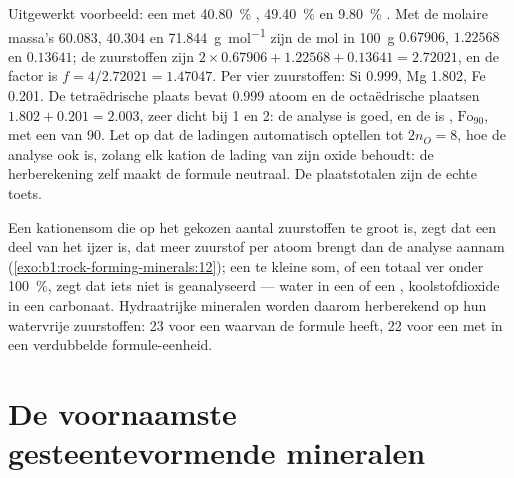 Uitgewerkt voorbeeld: een  met \qty{40.80}{\percent} , \qty{49.40}{\percent}  en \qty{9.80}{\percent} .
Met de molaire massa's \num{60.083}, \num{40.304} en \qty{71.844}{g.mol^{-1}} zijn de mol in \qty{100}{g} $0.67906$, $1.22568$ en $0.13641$; de
zuurstoffen zijn $2\times0.67906 + 1.22568 + 0.13641 = 2.72021$, en de factor is
$f = 4/2.72021 = 1.47047$. Per vier zuurstoffen: Si \num{0.999}, Mg \num{1.802},
Fe \num{0.201}. De tetraëdrische plaats bevat \num{0.999} atoom en de octaëdrische
plaatsen $1.802 + 0.201 = 2.003$, zeer dicht bij 1 en 2: de analyse is goed, en de  is , $\text{Fo}_{90}$,
met een  van 90. Let op dat de ladingen automatisch optellen tot $2n_O = 8$, hoe de analyse ook is, zolang elk kation de
lading van zijn oxide behoudt: de herberekening zelf maakt de formule neutraal. De plaatstotalen zijn de echte toets.

Een kationensom die op het gekozen aantal zuurstoffen te groot is, zegt dat een deel van het ijzer  is, dat meer zuurstof
per atoom brengt dan de analyse aannam (\cref{exo:b1:rock-forming-minerals:12}); een te kleine som, of een totaal ver onder
\qty{100}{\percent}, zegt dat iets niet is geanalyseerd --- water in een  of een , koolstofdioxide in een carbonaat.
Hydraatrijke mineralen worden daarom herberekend op hun watervrije zuurstoffen: 23 voor een  waarvan de formule
 heeft, 22 voor een  met  in een verdubbelde formule-eenheid.

\section{De voornaamste gesteentevormende mineralen}

